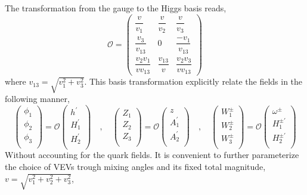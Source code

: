 The transformation from the gauge to the Higgs basis reads, 
\begin{equation}
\mathcal{O} = 
\begin{pmatrix}
\dfrac{v}{v_1} & \dfrac{v}{v_2}  & \dfrac{v}{v_3} \\[1.2em]
\dfrac{v_3}{v_{13}} & 0 & \dfrac{-v_1}{v_{13}} \\[1.2em]
\dfrac{v_2 v_1}{v v_{13}}  & \dfrac{v_{13}}{v} & \dfrac{v_2 v_3}{v v_{13}} 
\end{pmatrix}    
\end{equation}
%
where $v_{13}=\sqrt{v_1^2 + v_3^2}$. This basis transformation explicitly relate the fields in the following manner, 
%
\begin{equation}
\begin{pmatrix}
\phi_1 \\
\phi_2 \\
\phi_3 \\
\end{pmatrix} = 
\mathcal{O} \begin{pmatrix}
h^\prime \\
H_1^\prime \\
H_2^\prime \\
\end{pmatrix} 
%
\quad , \quad 
%
\begin{pmatrix}
Z_1 \\
Z_2 \\
Z_3 \\
\end{pmatrix} = 
\mathcal{O} \begin{pmatrix}
z \\
A_1^\prime  \\
A_2^\prime  \\
\end{pmatrix} 
%
\quad , \quad 
%
\begin{pmatrix}
W_1^\pm  \\
W_2^\pm  \\
W_3^\pm  \\
\end{pmatrix} = 
\mathcal{O} \begin{pmatrix}
\omega^\pm \\
H_1^{\pm \prime}  \\
H_2^{\pm \prime}  \\
\end{pmatrix} 
\end{equation}
%
Without accounting for the quark fields. It is convenient to further parameterize the choice of VEVs trough mixing angles and its fixed total magnitude, $v=\sqrt{v_1^2 + v_2^2 + v_3^2 }$,
